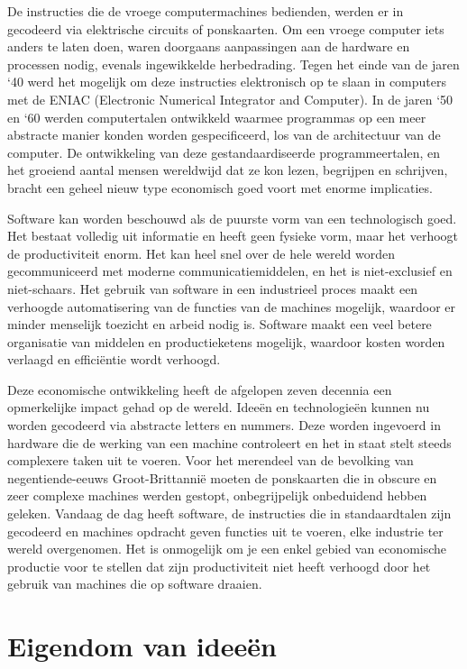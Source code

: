 De instructies die de vroege computermachines bedienden, werden er in gecodeerd via elektrische circuits of ponskaarten. Om een vroege computer iets anders te laten doen, waren doorgaans aanpassingen aan de hardware en processen nodig, evenals ingewikkelde herbedrading. Tegen het einde van de jaren `40 werd het mogelijk om deze instructies elektronisch op te slaan in computers met de ENIAC (Electronic Numerical Integrator and Computer). In de jaren `50 en `60 werden computertalen ontwikkeld waarmee programma\textquotesingle s op een meer abstracte manier konden worden gespecificeerd, los van de architectuur van de computer. De ontwikkeling van deze gestandaardiseerde programmeertalen, en het groeiend aantal mensen wereldwijd dat ze kon lezen, begrijpen en schrijven, bracht een geheel nieuw type economisch goed voort met enorme implicaties.

Software kan worden beschouwd als de puurste vorm van een technologisch goed. Het bestaat volledig uit informatie en heeft geen fysieke vorm, maar het verhoogt de productiviteit enorm. Het kan heel snel over de hele wereld worden gecommuniceerd met moderne communicatiemiddelen, en het is niet-exclusief en niet-schaars. Het gebruik van software in een industrieel proces maakt een verhoogde automatisering van de functies van de machines mogelijk, waardoor er minder menselijk toezicht en arbeid nodig is. Software maakt een veel betere organisatie van middelen en productieketens mogelijk, waardoor kosten worden verlaagd en efficiëntie wordt verhoogd.

Deze economische ontwikkeling heeft de afgelopen zeven decennia een opmerkelijke impact gehad op de wereld. Ideeën en technologieën kunnen nu worden gecodeerd via abstracte letters en nummers. Deze worden ingevoerd in hardware die de werking van een machine controleert en het in staat stelt steeds complexere taken uit te voeren. Voor het merendeel van de bevolking van negentiende-eeuws Groot-Brittannië moeten de ponskaarten die in obscure en zeer complexe machines werden gestopt, onbegrijpelijk onbeduidend hebben geleken. Vandaag de dag heeft software, de instructies die in standaardtalen zijn gecodeerd en machines opdracht geven functies uit te voeren, elke industrie ter wereld overgenomen. Het is onmogelijk om je een enkel gebied van economische productie voor te stellen dat zijn productiviteit niet heeft verhoogd door het gebruik van machines die op software draaien.

\hypertarget{eigendom-van-ideeuxebn}{%
\section{Eigendom van ideeën}\label{eigendom-van-ideeuxebn}}

